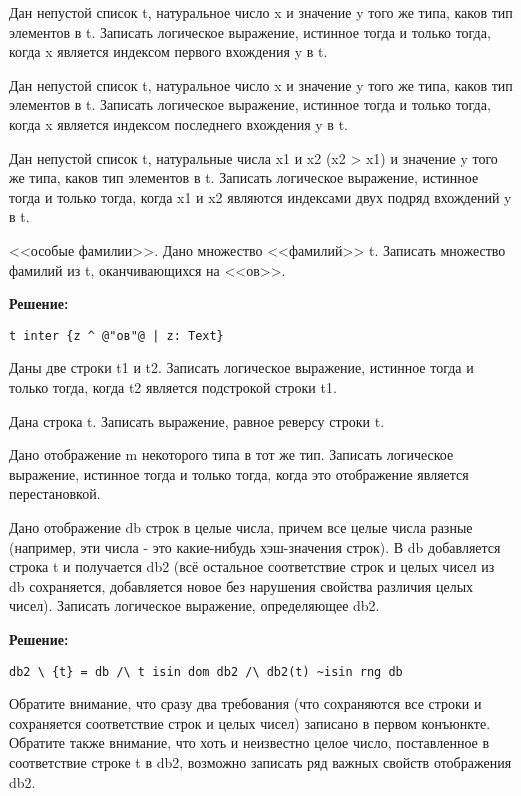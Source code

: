 \z Дан непустой список t, натуральное число x и значение y того же типа, каков тип элементов в t. Записать логическое выражение, истинное тогда и только тогда, когда x является индексом первого вхождения y в t.

\z Дан непустой список t, натуральное число x и значение y того же типа, каков тип элементов в t. Записать логическое выражение, истинное тогда и только тогда, когда x является индексом последнего вхождения y в t.

\z Дан непустой список t, натуральные числа x1 и x2 (x2 > x1) и значение y того же типа, каков тип элементов в t. Записать логическое выражение, истинное тогда и только тогда, когда x1 и x2 являются индексами двух подряд вхождений y в t.

\z <<особые фамилии>>. Дано множество <<фамилий>> t. Записать множество фамилий из t, оканчивающихся на <<ов>>.

\textbf{Решение:}
\begin{lstlisting}[escapechar={@}]
t inter {z ^ @"ов"@ | z: Text}
\end{lstlisting}

\z Даны две строки t1 и t2. Записать логическое выражение, истинное тогда и только тогда, когда t2 является подстрокой строки t1.

\z Дана строка t. Записать выражение, равное реверсу строки t.

\z Дано отображение m некоторого типа в тот же тип. Записать логическое выражение, истинное тогда и только тогда, когда это отображение является перестановкой.

\z Дано отображение db строк в целые числа, причем все целые числа разные (например, эти числа - это какие-нибудь хэш-значения строк). В db добавляется строка t и получается db2 (всё остальное соответствие строк и целых чисел из db сохраняется, добавляется новое без нарушения свойства различия целых чисел). Записать логическое выражение, определяющее db2.

\textbf{Решение:}
\begin{lstlisting}[escapechar={@}]
db2 \ {t} = db /\ t isin dom db2 /\ db2(t) ~isin rng db
\end{lstlisting}

Обратите внимание, что сразу два требования (что сохраняются все строки и сохраняется соответствие строк и целых чисел) записано в первом конъюнкте. Обратите также внимание, что хоть и неизвестно целое число, поставленное в соответствие строке t в db2, возможно записать ряд важных свойств отображения db2.

